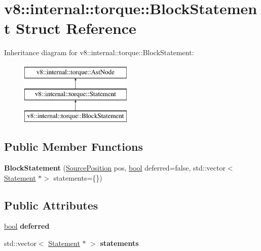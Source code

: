 \hypertarget{structv8_1_1internal_1_1torque_1_1BlockStatement}{}\section{v8\+:\+:internal\+:\+:torque\+:\+:Block\+Statement Struct Reference}
\label{structv8_1_1internal_1_1torque_1_1BlockStatement}
Inheritance diagram for v8\+:\+:internal\+:\+:torque\+:\+:Block\+Statement\+:\begin{figure}[H]
\begin{center}
\leavevmode
\includegraphics[height=3.000000cm]{structv8_1_1internal_1_1torque_1_1BlockStatement}
\end{center}
\end{figure}
\subsection*{Public Member Functions}
\begin{DoxyCompactItemize}
\item 
\mbox{\label{structv8_1_1internal_1_1torque_1_1BlockStatement_ac17c5c6488cda055fbf2db457a438a76}} 
{\bfseries Block\+Statement} (\mbox{\hyperlink{structv8_1_1internal_1_1torque_1_1SourcePosition}{Source\+Position}} pos, \mbox{\hyperlink{classbool}{bool}} deferred=false, std\+::vector$<$ \mbox{\hyperlink{structv8_1_1internal_1_1torque_1_1Statement}{Statement}} $\ast$$>$ statements=\{\})
\end{DoxyCompactItemize}
\subsection*{Public Attributes}
\begin{DoxyCompactItemize}
\item 
\mbox{\label{structv8_1_1internal_1_1torque_1_1BlockStatement_a8e1eac49fef3ee2fe725b6f76e57f373}} 
\mbox{\hyperlink{classbool}{bool}} {\bfseries deferred}
\item 
\mbox{\label{structv8_1_1internal_1_1torque_1_1BlockStatement_ad5972c99b6055e0401c826e140a61778}} 
std\+::vector$<$ \mbox{\hyperlink{structv8_1_1internal_1_1torque_1_1Statement}{Statement}} $\ast$ $>$ {\bfseries statements}
\end{DoxyCompactItemize}
